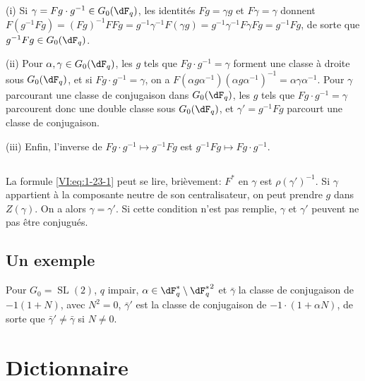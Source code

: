 (i) Si $\gamma= F g\cdot g^{-1}\in G_0(\dF_q)$, les identités $F g=\gamma g$ 
et 
$F\gamma=\gamma$ donnent $F(g^{-1} F g) = (F g)^{-1} F F g = g^{-1} \gamma^{-1} F(\gamma g) = g^{-1} \gamma^{-1} F \gamma F g = g^{-1} F g$, 
de sorte que $g^{-1} F g \in G_0(\dF_q)$. 

(ii) Pour $\alpha,\gamma\in G_0(\dF_q)$, les $g$ tels que 
$F g\cdot g^{-1} = \gamma$ forment une classe à droite sous $G_0(\dF_q)$, et 
si $F g\cdot g^{-1} = \gamma$, on a 
$F(\alpha g \alpha^{-1})(\alpha g \alpha^{-1})^{-1} = \alpha \gamma\alpha^{-1}$. 
Pour $\gamma$ parcourant une classe de conjugaison dans $G_0(\dF_q)$, les $g$ 
tels que $F g\cdot g^{-1} = \gamma$ parcourent donc une double classe sous 
$G_0(\dF_q)$, et $\gamma'= g^{-1} F g$ parcourt une classe de conjugaison. 

(iii) Enfin, l'inverse de $F g\cdot g^{-1}\mapsto g^{-1} F g$ est 
$g^{-1} F g\mapsto F g\cdot g^{-1}$. 





\subsection{}\label{VI:1-25}

La formule \eqref{VI:eq:1-23-1} peut se lire, brièvement: $F^\ast$ en 
$\gamma$ est $\rho(\gamma')^{-1}$. Si $\gamma$ appartient à la composante 
neutre de son centralisateur, on peut prendre $g$ dans $Z(\gamma)$. On a alors 
$\gamma=\gamma'$. Si cette condition n'est pas remplie, $\gamma$ et $\gamma'$ 
peuvent ne pas être conjugués. 





\subsection{Un exemple}\label{VI:1-26}

Pour $G_0=\operatorname{SL}(2)$, $q$ impair, 
$\alpha\in \dF_q^\ast\setminus {\dF_q^\ast}^2$ et $\bar\gamma$ la classe de 
conjugaison de $-1(1+N)$, avec $N^2=0$, $\bar\gamma'$ est la classe de 
conjugaison de $-1\cdot (1+\alpha N)$, de sorte que $\bar\gamma'\ne \bar\gamma$ 
si $N\ne 0$. 











\section{Dictionnaire}\label{VI:2}

